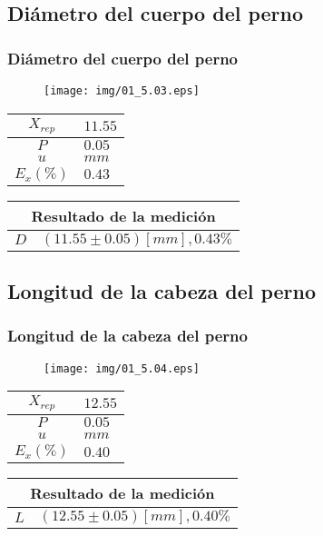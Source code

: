 \documentclass[letter,11pt]{beamer}
\begin{document}
\subsection{Diámetro del cuerpo del perno}
\begin{frame}
\frametitle{Diámetro del cuerpo del perno}
\vspace*{0.8cm}
\begin{figure}
\centering
\texttt{[image: img/01\_5.03.eps]}
\end{figure}
\vspace*{0.4cm}
\scriptsize
\begin{tabular}{|c|>{\centering}m{1.8cm}<{\centering}|}
\hline
$X_{rep}$ &  $11.55$ \tabularnewline \hline
      $P$ &   $0.05$ \tabularnewline \hline
      $u$ &     $mm$ \tabularnewline \hline
$E_x(\%)$ &   $0.43$ \tabularnewline \hline
\end{tabular}
\quad
\begin{tabular}{|c|>{\centering}m{5.7cm}<{\centering}|}
\hline
\multicolumn{2}{|c|}{\textbf{Resultado de la medición}} \\ \hline
$D$ & $( 11.55\pm0.05)[mm], 0.43\%$ \tabularnewline \hline
\end{tabular}
\end{frame}

\subsection{Longitud de la cabeza del perno}
\begin{frame}
\frametitle{Longitud de la cabeza del perno}
\vspace*{0.8cm}
\begin{figure}
\centering
\texttt{[image: img/01\_5.04.eps]}
\end{figure}
\vspace*{0.4cm}
\scriptsize
\begin{tabular}{|c|>{\centering}m{1.8cm}<{\centering}|}
\hline
$X_{rep}$ &  $12.55$ \tabularnewline \hline
      $P$ &   $0.05$ \tabularnewline \hline
      $u$ &     $mm$ \tabularnewline \hline
$E_x(\%)$ &   $0.40$ \tabularnewline \hline
\end{tabular}
\quad
\begin{tabular}{|c|>{\centering}m{5.7cm}<{\centering}|}
\hline
\multicolumn{2}{|c|}{\textbf{Resultado de la medición}} \\ \hline
$L$ & $( 12.55\pm0.05)[mm], 0.40\%$ \tabularnewline \hline
\end{tabular}
\end{frame}
\end{document}
